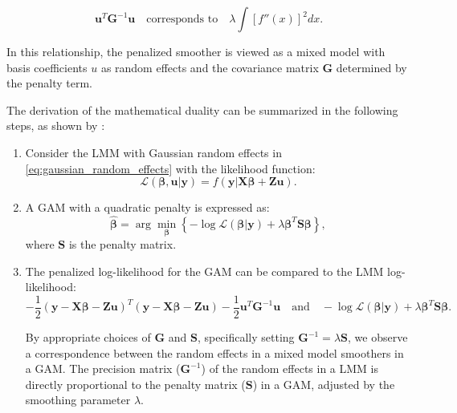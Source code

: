 \documentclass[12pt, twoside,hidelinks]{article}
\theoremstyle{definition}
\numberwithin{equation}{section}
\begin{document}
\begin{equation}
    \boldsymbol{u}^T \mathbf{G}^{-1} \boldsymbol{u} \quad \text{corresponds to} \quad \lambda \int [f''(x)]^2 dx .
    \label{eq:equivalence}
\end{equation}

In this relationship, the penalized smoother is viewed as a mixed model with basis coefficients \( u \) as random effects and the covariance matrix \( \mathbf{G} \) determined by the penalty term.
\newline

The derivation of the mathematical duality can be summarized in the following steps, as shown by \citet{wood2017}:

\begin{enumerate}
    \item Consider the LMM with Gaussian random effects in \ref{eq:gaussian_random_effects}
    with the likelihood function:
    \begin{equation}
    \mathcal{L}(\boldsymbol{\beta}, \boldsymbol{u} | \boldsymbol{y}) = f(\boldsymbol{y} | \mathbf{X}\boldsymbol{\beta} + \mathbf{Z}\boldsymbol{u}).
    \label{eq:lmm_likelihood}
    \end{equation}
    
    \item A GAM with a quadratic penalty is expressed as:
    \begin{equation}
    \hat{\boldsymbol{\beta}} = \arg\min_{\boldsymbol{\beta}} \left\{ -\log \mathcal{L}(\boldsymbol{\beta} | \boldsymbol{y}) + \lambda \boldsymbol{\beta}^T \mathbf{S} \boldsymbol{\beta} \right\},
    \label{eq:gam_penalty}
    \end{equation}
    where \( \mathbf{S} \) is the penalty matrix.
    
    \item The penalized log-likelihood for the GAM can be compared to the LMM log-likelihood:
    \begin{equation}
    -\frac{1}{2} (\boldsymbol{y} - \mathbf{X}\boldsymbol{\beta} - \mathbf{Z}\boldsymbol{u})^T (\boldsymbol{y} - \mathbf{X}\boldsymbol{\beta} - \mathbf{Z}\boldsymbol{u}) - \frac{1}{2} \boldsymbol{u}^T \mathbf{G}^{-1} \boldsymbol{u} \quad \text{and} \quad -\log \mathcal{L}(\boldsymbol{\beta} | \boldsymbol{y}) + \lambda \boldsymbol{\beta}^T \mathbf{S} \boldsymbol{\beta}.
    \label{eq:equivalence_derivation}
    \end{equation}

    By appropriate choices of \(\mathbf{G}\) and \(\mathbf{S}\), specifically setting \(\mathbf{G}^{-1} = \lambda \mathbf{S}\), we observe a correspondence between the random effects in a mixed model smoothers in a GAM. The precision matrix (\(\mathbf{G}^{-1}\)) of the random effects in a LMM is directly proportional to the penalty matrix (\(\mathbf{S}\)) in a GAM, adjusted by the smoothing parameter \(\lambda\).


\end{enumerate}
\end{document}
